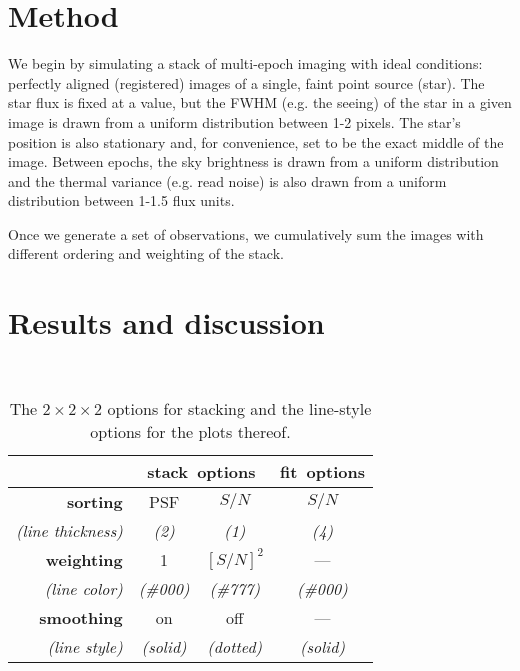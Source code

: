 \documentclass[12pt,preprint]{aastex}
\begin{document}
\section{Method}
We begin by simulating a stack of multi-epoch imaging with ideal conditions: perfectly aligned (registered) images of a single, faint point source (star). The star flux is fixed at a value, but the FWHM (e.g. the seeing) of the star in a given image is drawn from a uniform distribution between 1-2 pixels. The star's position is also stationary and, for convenience, set to be the exact middle of the image. Between epochs, the sky brightness is drawn from a uniform distribution and the thermal variance (e.g. read noise) is also drawn from a uniform distribution between 1-1.5 flux units. %

Once we generate a set of observations, we cumulatively sum the images with different ordering and weighting of the stack. 

\section{Results and discussion}

\clearpage
\begin{table}
~ \hfill \begin{tabular}{rcc|c}
 & \multicolumn{2}{c}{\textbf{stack~options}} & \textbf{fit~options} \\
\hline
 \textbf{sorting} & PSF & $S/N$ & $S/N$ \\
 \small\em (line thickness) & \small\em (2) & \small\em (1) & \small\em (4) \\
\hline
 \textbf{weighting} & 1 & $[S/N]^2$ & --- \\
 \small\em (line color) & \small\em (\#000) & \small\em (\#777) & \small\em (\#000) \\
\hline
 \textbf{smoothing} & on & off & --- \\
 \small\em (line style) & \small\em (solid) & \small\em (dotted) & \small\em (solid) \\
\hline
\end{tabular} \hfill ~
\caption{The $2\times 2\times 2$ options for stacking and the
  line-style options for the plots thereof.\label{tab:legend}}
\end{table}
\end{document}
